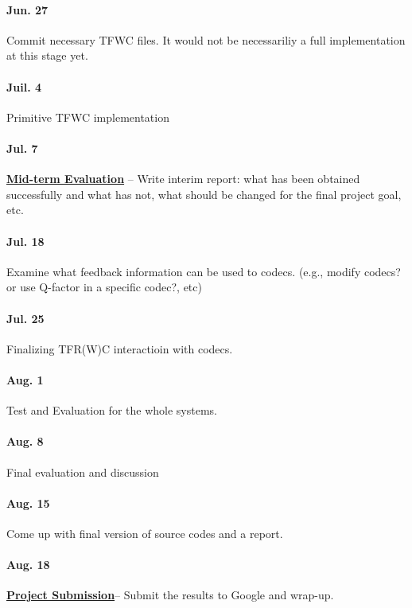 \paragraph{\textsf{Jun. 27}} Commit necessary TFWC files. It would not be
necessariliy a full implementation at this stage yet.

\paragraph{\textsf{Juil. 4}} Primitive TFWC implementation

\paragraph{\textsf{Jul. 7}} \underline{\textbf{Mid-term Evaluation}} -- Write
interim report: what has been obtained successfully and what has not, what
should be changed for the final project goal, etc.

\paragraph{\textsf{Jul. 18}} Examine what feedback information can be used to
codecs.  (e.g., modify codecs? or use Q-factor in a specific codec?, etc)

\paragraph{\textsf{Jul. 25}} Finalizing TFR(W)C interactioin with codecs.

\paragraph{\textsf{Aug. 1}} Test and Evaluation for the whole systems.

\paragraph{\textsf{Aug. 8}} Final evaluation and discussion

\paragraph{\textsf{Aug. 15}} Come up with final version of source codes and a
report.

\paragraph{\textsf{Aug. 18}} \underline{\textbf{Project Submission}}-- Submit
the results to Google and wrap-up.

